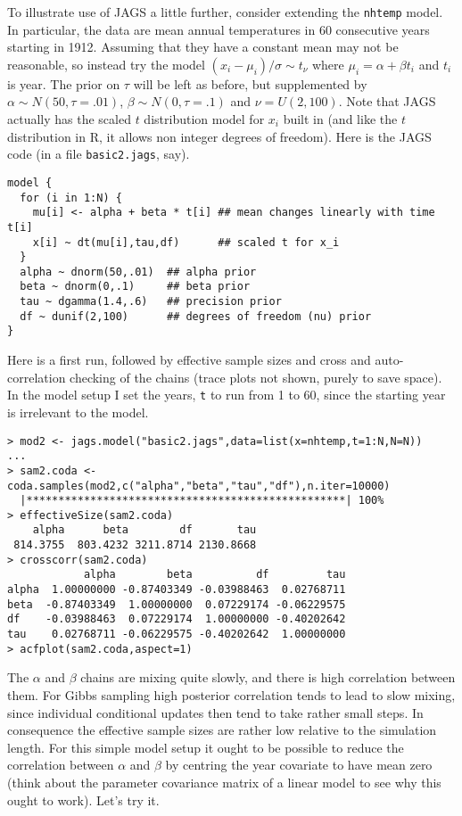 \documentclass[10pt] {article}
\newcommand{\eps}[3]
{{\begin{center}
 \rotatebox{#1}{\scalebox{#2}{\texttt{[image: \#3]}}}
 \end{center}}
}
\theoremstyle{definition}
\begin{document}
To illustrate use of JAGS a little further, consider extending the {\tt nhtemp} model. In particular, the data are mean annual temperatures in 60 consecutive years starting in 1912. Assuming that they have a constant mean may not be reasonable, so instead try the model $(x_i-\mu_i)/\sigma \sim t_\nu$ where $\mu_i = \alpha + \beta t_i$ and $t_i$ is year. The prior on $\tau$ will be left as before, but supplemented by $\alpha \sim N(50,\tau=.01)$, $\beta \sim N(0,\tau=.1)$ and $\nu = U(2,100)$. Note that JAGS actually has the scaled $t$ distribution model for $x_i$ built in (and like the $t$ distribution in R, it allows non integer degrees of freedom). Here is the JAGS code (in a file {\tt basic2.jags}, say).
\begin{lstlisting}
model {
  for (i in 1:N) {
    mu[i] <- alpha + beta * t[i] ## mean changes linearly with time t[i]
    x[i] ~ dt(mu[i],tau,df)      ## scaled t for x_i
  }
  alpha ~ dnorm(50,.01)  ## alpha prior
  beta ~ dnorm(0,.1)     ## beta prior
  tau ~ dgamma(1.4,.6)   ## precision prior
  df ~ dunif(2,100)      ## degrees of freedom (nu) prior
}
\end{lstlisting}
Here is a first run, followed by effective sample sizes and cross and auto-correlation checking of the chains (trace plots not shown, purely to save space). In the model setup I set the years, {\tt t} to run from 1 to 60, since the starting year is irrelevant to the model. 
\begin{lstlisting}
> mod2 <- jags.model("basic2.jags",data=list(x=nhtemp,t=1:N,N=N))
...
> sam2.coda <- coda.samples(mod2,c("alpha","beta","tau","df"),n.iter=10000)
  |**************************************************| 100%
> effectiveSize(sam2.coda)
    alpha      beta        df       tau 
 814.3755  803.4232 3211.8714 2130.8668 
> crosscorr(sam2.coda)
            alpha        beta          df         tau
alpha  1.00000000 -0.87403349 -0.03988463  0.02768711
beta  -0.87403349  1.00000000  0.07229174 -0.06229575
df    -0.03988463  0.07229174  1.00000000 -0.40202642
tau    0.02768711 -0.06229575 -0.40202642  1.00000000
> acfplot(sam2.coda,aspect=1)
\end{lstlisting}
\vspace*{-1cm}
\eps{-90}{.5}{nht-acf2.eps}
\noindent The $\alpha $ and $\beta$ chains are mixing quite slowly, and there is high correlation between them. For Gibbs sampling high posterior correlation 
tends to lead to slow mixing, since individual conditional updates then tend to take rather small steps. In consequence the effective sample sizes are rather low relative to the simulation length. For this simple model setup it ought to be possible to reduce the correlation between $\alpha$ and $\beta $ by centring the year covariate to have mean zero (think about the parameter covariance matrix of a linear model to see why this ought to work). Let's try it. 
\end{document}
